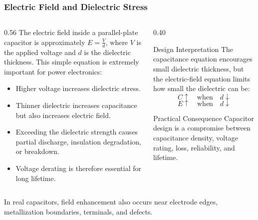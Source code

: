 \begin{frame}
\frametitle{Electric Field and Dielectric Stress}

\begin{columns}
\begin{column}{0.56\textwidth}
The electric field inside a parallel-plate capacitor is approximately $E = \frac{V}{d}$, where $V$ is the applied voltage and $d$ is the dielectric thickness. This simple equation is extremely important for power electronics:
\begin{itemize}
    \item Higher voltage increases dielectric stress.
    \item Thinner dielectric increases capacitance but also increases electric field.
    \item Exceeding the dielectric strength causes partial discharge, insulation degradation, or breakdown.
    \item Voltage derating is therefore essential for long lifetime.
\end{itemize}
\end{column}

\begin{column}{0.40\textwidth}
    \vspace{-0.75cm}
\begin{block}{Design Interpretation}
The capacitance equation encourages small dielectric thickness, but the electric-field equation limits how small the dielectric can be:
\[
C \uparrow \quad \text{when} \quad d \downarrow
\]
\[
E \uparrow \quad \text{when} \quad d \downarrow
\]
\end{block}
\begin{block}{Practical Consequence}
Capacitor design is a compromise between capacitance density, voltage rating, loss, reliability, and lifetime.
\end{block}
\end{column}
\end{columns}
In real capacitors, field enhancement also occurs near electrode edges, metallization boundaries, terminals, and defects.
\end{frame}


